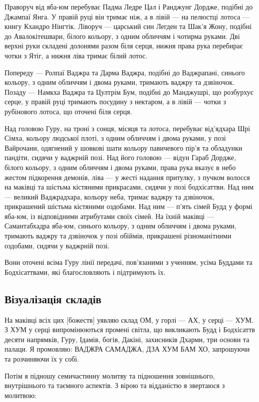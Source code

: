 \documentclass{article}
\begin{document}
Праворуч від яба-юм перебуває Падма Ледре Цал і Ранджунг Дордже,
подібні до Джампаї Янга. У правій руці він тримає ніж, а в лівій — на
пелюстці лотоса — книгу Кхандро Нінгтік. Ліворуч — царський син Легден
та Шак’я Жону, подібні до Авалокітешвари, білого кольору, з одним
обличчям і чотирма руками. Дві верхні руки складені долонями разом
біля серця, нижня права рука перебирає чотки з Ятіг, а нижня ліва
тримає білий лотос.

Попереду — Ролпаї Ваджра та Дарма Ваджра, подібні до Ваджрапані,
синього кольору, з одним обличчям і двома руками, тримають ваджру
та дзвіночок. Позаду — Намкха Ваджра та Цултрім Бум, подібні до
Манджушрі, що розбурхує серце, у правій руці тримають посудину з
нектаром, а в лівій — чотки з рубінового лотоса, що оточені біля серця.

Над головою Гуру, на троні з сонця, місяця та лотоса, перебуває від'ядхара
Шрі Сімха, кольору людської плоті, з одним обличчям і двома руками,
у позі Вайрочани, одягнений у шовкові шати кольору павичевого пір’я
та обладунки пандіти, сидячи у ваджрній позі. Над його головою — відун
Гараб Дордже, білого кольору, з одним обличчям і двома руками, права
рука вказує в небо жестом підкорення демонів, ліва — у жесті надання
притулку, з пучком волосся на маківці та шістьма кістяними прикрасами,
сидячи у позі бодхісаттви. Над ним — великий Ваджрадхара, кольору неба,
тримає ваджру та дзвіночок, прикрашений шістьма кістяними оздобами.
Над ним — п’ять сімей Будд у формі яба-юм, із відповідними атрибутами
своїх сімей. На їхній маківці — Самантабхадра яба-юм, синього кольору,
з одним обличчям і двома руками, тримають ваджру та дзвіночок у позі
обіймів, прикрашені різноманітними оздобами, сидячи у ваджрній позі.

Вони оточені всіма Гуру лінії передачі, пов’язаними з ученням, усіма
Буддами та Бодхісаттвами, які благословляють і підтримують їх.

\subsection{Візуалізація складів}

На маківці всіх цих [божеств] уявляю склад ОМ, у горлі — АХ, у
серці — ХУМ. З ХУМ у серці випромінюються промені світла, що
викликають Будд і Бодхісаттв десяти напрямків, Гуру, Ідамів,
богів, Дакіні, захисників Дхарми, три основи та палаци. Я промовляю:
ВАДЖРА САМАДЖА, ДЗА ХУМ БАМ ХО, запрошуючи та розчиняючи їх у собі.

Потім я підношу семичастинну молитву та підношення зовнішнього,
внутрішнього та таємного аспектів. З вірою та відданістю я звертаюся з молитвою:
\end{document}
